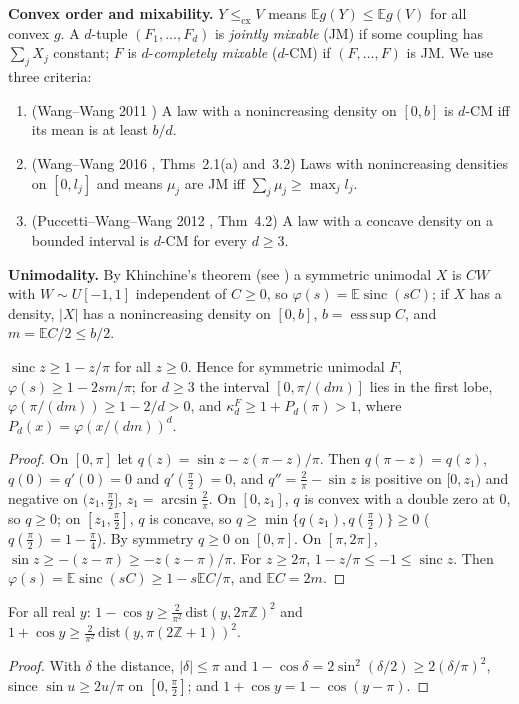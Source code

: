 \documentclass[11pt]{amsart}
\theoremstyle{definition}\newtheorem{definition}[theorem]{Definition}\theoremstyle{remark}\newtheorem{remark}[theorem]{Remark}
\newcommand{\sinc}{\operatorname{sinc}}\newcommand{\E}{\mathbb E}\newcommand{\cx}{\le_{\mathrm{cx}}}
\begin{document}
\medskip\noindent\textbf{Convex order and mixability.} $Y\cx V$ means $\E g(Y)\le\E g(V)$ for all convex $g$. A $d$-tuple $(F_1,\dots,F_d)$ is \emph{jointly mixable} (JM) if some coupling
has $\sum_jX_j$ constant; $F$ is $d$-\emph{completely mixable} ($d$-CM) if $(F,\dots,F)$ is JM. We use three criteria:
\begin{enumerate}
\item[(M1)] (Wang--Wang 2011 \cite{WW11}) A law with a nonincreasing density on $[0,b]$ is $d$-CM iff its mean is at least $b/d$.
\item[(M2)] (Wang--Wang 2016 \cite{WW16}, Thms~2.1(a) and~3.2) Laws with nonincreasing densities on $[0,l_j]$ and means $\mu_j$ are JM iff $\sum_j\mu_j\ge\max_jl_j$.
\item[(M3)] (Puccetti--Wang--Wang 2012 \cite{PWW12}, Thm~4.2) A law with a concave density on a bounded interval is $d$-CM for every $d\ge3$.
\end{enumerate}
\noindent\textbf{Unimodality.} By Khinchine's theorem (see \cite{DJ88}) a symmetric unimodal $X$ is $CW$ with $W\sim U[-1,1]$ independent of $C\ge0$, so
$\varphi(s)=\E\sinc(sC)$; if $X$ has a density, $|X|$ has a nonincreasing density on $[0,b]$, $b=\operatorname{ess\,sup}C$, and $m=\E C/2\le b/2$.
\begin{lemma}\label{lem:lobe}
$\sinc z\ge1-z/\pi$ for all $z\ge0$. Hence for symmetric unimodal $F$, $\varphi(s)\ge1-2sm/\pi$; for $d\ge3$ the interval $[0,\pi/(dm)]$ lies in the first lobe,
$\varphi(\pi/(dm))\ge1-2/d>0$, and $\kappa_d^F\ge1+P_d(\pi)>1$, where $P_d(x)=\varphi(x/(dm))^d$.
\end{lemma}
\begin{proof}On $[0,\pi]$ let $q(z)=\sin z-z(\pi-z)/\pi$. Then $q(\pi-z)=q(z)$, $q(0)=q'(0)=0$ and $q'(\frac\pi2)=0$, and $q''=\frac2\pi-\sin z$ is
positive on $[0,z_1)$ and negative on $(z_1,\frac\pi2]$, $z_1=\arcsin\frac2\pi$. On $[0,z_1]$, $q$ is convex with a double zero at $0$, so $q\ge0$; on $[z_1,\frac\pi2]$, $q$ is
concave, so $q\ge\min\{q(z_1),q(\frac\pi2)\}\ge0$ ($q(\frac\pi2)=1-\frac\pi4$). By symmetry $q\ge0$ on $[0,\pi]$. On $[\pi,2\pi]$, $\sin z\ge-(z-\pi)\ge-z(z-\pi)/\pi$. For $z\ge2\pi$, $1-z/\pi\le-1\le\sinc z$. Then
$\varphi(s)=\E\sinc(sC)\ge1-s\E C/\pi$, and $\E C=2m$.\end{proof}
\begin{lemma}\label{lem:latsep}
For all real $y$: $1-\cos y\ge\frac2{\pi^2}\,\mathrm{dist}(y,2\pi\mathbb Z)^2$ and $1+\cos y\ge\frac2{\pi^2}\,\mathrm{dist}(y,\pi(2\mathbb Z+1))^2$.
\end{lemma}
\begin{proof}With $\delta$ the distance, $|\delta|\le\pi$ and $1-\cos\delta=2\sin^2(\delta/2)\ge2(\delta/\pi)^2$, since $\sin u\ge2u/\pi$ on $[0,\frac\pi2]$; and $1+\cos y=1-\cos(y-\pi)$.\end{proof}
\end{document}
